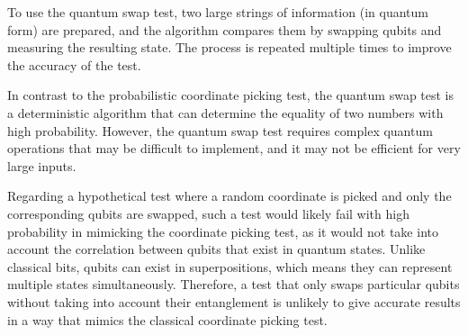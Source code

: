 To use the quantum swap test, two large strings of information (in quantum form) are prepared, and the algorithm compares them by swapping qubits and measuring the resulting state. The process is repeated multiple times to improve the accuracy of the test. 

In contrast to the probabilistic coordinate picking test, the quantum swap test is a deterministic algorithm that can determine the equality of two numbers with high probability. However, the quantum swap test requires complex quantum operations that may be difficult to implement, and it may not be efficient for very large inputs.

Regarding a hypothetical test where a random coordinate is picked and only the corresponding qubits are swapped, such a test would likely fail with high probability in mimicking the coordinate picking test, as it would not take into account the correlation between qubits that exist in quantum states. Unlike classical bits, qubits can exist in superpositions, which means they can represent multiple states simultaneously. Therefore, a test that only swaps particular qubits without taking into account their entanglement is unlikely to give accurate results in a way that mimics the classical coordinate picking test.



